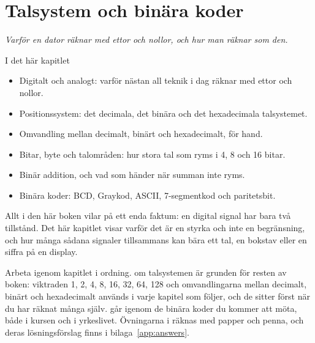 
\chapter{Talsystem och binära koder}
\label{c1:ch}

{\large\itshape Varför en dator räknar med ettor och nollor, och hur man räknar som den.\par}

\begin{chapterbox}{I det här kapitlet}
\begin{itemize}
  \item Digitalt och analogt: varför nästan all teknik i dag räknar med ettor och nollor.
  \item Positionssystem: det decimala, det binära och det hexadecimala talsystemet.
  \item Omvandling mellan decimalt, binärt och hexadecimalt, för hand.
  \item Bitar, byte och talområden: hur stora tal som ryms i 4, 8 och 16 bitar.
  \item Binär addition, och vad som händer när summan inte ryms.
  \item Binära koder: BCD, Graykod, ASCII, 7-segmentkod och paritetsbit.
\end{itemize}
\end{chapterbox}

Allt i den här boken vilar på ett enda faktum: en digital signal har bara två tillstånd. Det här
kapitlet visar varför det är en styrka och inte en begränsning, och hur många sådana signaler
tillsammans kan bära ett tal, en bokstav eller en siffra på en display.

Arbeta igenom kapitlet i ordning.  om talsystemen är grunden för resten av boken:
viktraden 1, 2, 4, 8, 16, 32, 64, 128 och omvandlingarna mellan decimalt, binärt och hexadecimalt
används i varje kapitel som följer, och de sitter först när du har räknat många själv.
 går igenom de binära koder du kommer att möta, både i kursen och i yrkeslivet.
Övningarna i  räknas med papper och penna, och deras lösningsförslag
finns i bilaga~\ref{app:answers}.





